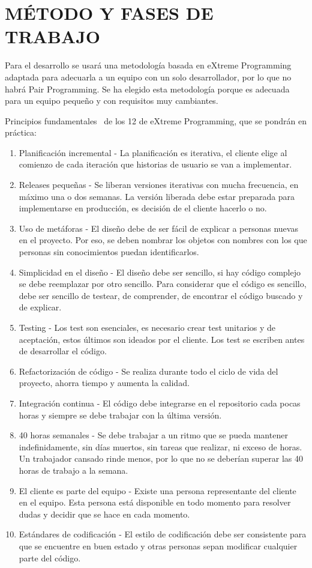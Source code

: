 \documentclass{pre-tfg}
\begin{document}
    \section{MÉTODO Y FASES DE TRABAJO}

    Para el desarrollo se usará una metodología basada en eXtreme Programming~\cite{XP} adaptada para
    adecuarla a un equipo con un solo desarrollador, por lo que no habrá Pair Programming.
    Se ha elegido esta metodología porque es adecuada para un equipo pequeño y con requisitos
    muy cambiantes.


    Principios fundamentales~\cite{XPAGIL} de los 12 de eXtreme Programming, que se pondrán en práctica:
    \begin{enumerate}
        \item Planificación incremental - La planificación es iterativa, el cliente elige al comienzo de cada
        iteración que historias de usuario se van a implementar.
        \item Releases pequeñas - Se liberan versiones iterativas con mucha frecuencia, en máximo una o dos semanas.
        La versión liberada debe estar preparada para implementarse en producción, es decisión de el cliente hacerlo
        o no.
        \item Uso de metáforas - El diseño debe de ser fácil de explicar a personas nuevas en el proyecto. Por eso,
        se deben nombrar los objetos con nombres con los que personas sin conocimientos puedan identificarlos.
        \item Simplicidad en el diseño - El diseño debe ser sencillo, si hay código complejo se debe reemplazar
        por otro sencillo. Para considerar que el código es sencillo, debe ser sencillo de testear, de comprender,
        de encontrar el código buscado y de explicar.
        \item Testing - Los test son esenciales, es necesario crear test unitarios y de aceptación, estos últimos
        son ideados por el cliente. Los test se escriben antes de desarrollar el código.
        \item Refactorización de código - Se realiza durante todo el ciclo de vida del proyecto, ahorra tiempo
        y aumenta la calidad.
        \item Integración continua - El código debe integrarse en el repositorio cada pocas horas y siempre se debe
        trabajar con la última versión.
        \item 40 horas semanales - Se debe trabajar a un ritmo que se pueda mantener indefinidamente, sin días muertos,
        sin tareas que realizar, ni exceso de horas. Un trabajador cansado rinde menos, por lo que no se deberían
        superar las 40 horas de trabajo a la semana.
        \item El cliente es parte del equipo - Existe una persona representante del cliente en el equipo. Esta persona
        está disponible en todo momento para resolver dudas y decidir que se hace en cada momento.
        \item Estándares de codificación - El estilo de codificación debe ser consistente para que se encuentre en
        buen estado y otras personas sepan modificar cualquier parte del código.
    \end{enumerate}
\end{document}
